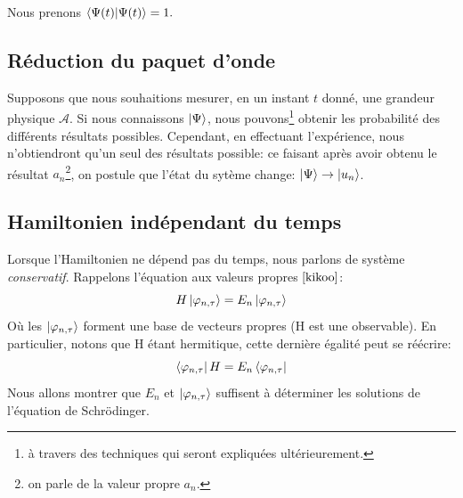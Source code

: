 \documentclass[../notesdecours.tex]{subfiles}
\begin{document}
\begin{remark} Nous prenons $\braket{\Psi(t)|\Psi(t)} = 1.$ \end{remark}

\subsection{Réduction du paquet d'onde}
Supposons que nous souhaitions mesurer, en un instant $t$ donné, une grandeur physique $\mathcal{A}$. Si nous connaissons $\ket{\Psi}$, nous pouvons\footnote{à travers des techniques qui seront expliquées ultérieurement.} obtenir les probabilité des différents résultats possibles. Cependant, en effectuant l'expérience, nous n'obtiendront qu'un seul des résultats possible: ce faisant après avoir obtenu le résultat $a_n$\footnote{on parle de la valeur propre $a_n$.}, on postule que l'état du sytème change: $\ket{\Psi} \to \ket{u_n}$.

\begin{center}
\end{center}


\subsection{Hamiltonien indépendant du temps}
Lorsque l'Hamiltonien ne dépend pas du temps, nous parlons de système \emph{conservatif}. Rappelons l'équation aux valeurs propres $\eqref{kikoo}$:
\begin{equation*}
H\ket{\varphi_{n,\tau}} = E_n \ket{\varphi_{n,\tau}}
\end{equation*}
Où les $\ket{\varphi_{n,\tau}}$ forment une base de vecteurs propres (H est une observable). En particulier, notons que H étant hermitique, cette dernière égalité peut se réécrire:
\begin{equation}
\bra{\varphi_{n,\tau}}H = E_n \bra{\varphi_{n,\tau}}
\end{equation}
Nous allons montrer que $E_n$ et $\ket{\varphi_{n,\tau}}$ suffisent à déterminer les solutions de l'équation de Schrödinger.\\
\end{document}
